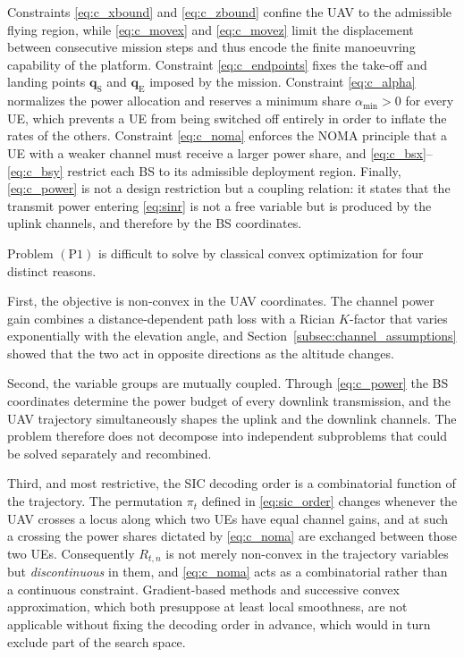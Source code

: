 \documentclass[conference]{IEEEtran}
\begin{document}
Constraints \eqref{eq:c_xbound} and \eqref{eq:c_zbound} confine the UAV
to the admissible flying region, while \eqref{eq:c_movex} and
\eqref{eq:c_movez} limit the displacement between consecutive mission
steps and thus encode the finite manoeuvring capability of the platform.
Constraint \eqref{eq:c_endpoints} fixes the take-off and landing points
$\mathbf{q}_{\mathrm{S}}$ and $\mathbf{q}_{\mathrm{E}}$ imposed by the
mission. Constraint \eqref{eq:c_alpha} normalizes the power allocation
and reserves a minimum share $\alpha_{\min}>0$ for every UE, which
prevents a UE from being switched off entirely in order to inflate the
rates of the others. Constraint \eqref{eq:c_noma} enforces the NOMA
principle that a UE with a weaker channel must receive a larger power
share, and \eqref{eq:c_bsx}--\eqref{eq:c_bsy} restrict each BS to its
admissible deployment region. Finally, \eqref{eq:c_power} is not a
design restriction but a coupling relation: it states that the transmit
power entering \eqref{eq:sinr} is not a free variable but is produced by
the uplink channels, and therefore by the BS coordinates.

Problem $(\mathrm{P1})$ is difficult to solve by classical convex
optimization for four distinct reasons.

First, the objective is non-convex in the UAV coordinates. The channel
power gain combines a distance-dependent path loss with a Rician
$K$-factor that varies exponentially with the elevation angle, and
Section~\ref{subsec:channel_assumptions} showed that the two act in
opposite directions as the altitude changes.

Second, the variable groups are mutually coupled. Through
\eqref{eq:c_power} the BS coordinates determine the power budget of
every downlink transmission, and the UAV trajectory simultaneously
shapes the uplink and the downlink channels. The problem therefore does
not decompose into independent subproblems that could be solved
separately and recombined.

Third, and most restrictive, the SIC decoding order is a combinatorial
function of the trajectory. The permutation $\pi_{t}$ defined in
\eqref{eq:sic_order} changes whenever the UAV crosses a locus along
which two UEs have equal channel gains, and at such a crossing the power
shares dictated by \eqref{eq:c_noma} are exchanged between those two
UEs. Consequently $R_{t,n}$ is not merely non-convex in the trajectory
variables but \emph{discontinuous} in them, and \eqref{eq:c_noma} acts as
a combinatorial rather than a continuous constraint. Gradient-based
methods and successive convex approximation, which both presuppose at
least local smoothness, are not applicable without fixing the decoding
order in advance, which would in turn exclude part of the search space.
\end{document}
